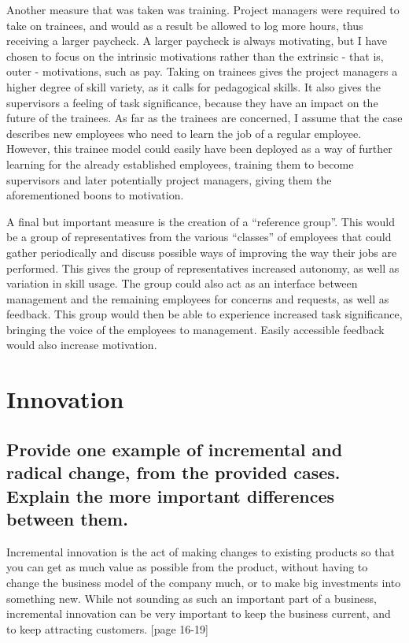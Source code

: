 \documentclass[a4paper]{article}
\begin{document}
    Another measure that was taken was training. Project managers were
    required to take on trainees, and would as a result be allowed to log
    more hours, thus receiving a larger paycheck. A larger paycheck is always
    motivating, but I have chosen to focus on the intrinsic motivations rather
    than the extrinsic - that is, outer - motivations, such as pay. Taking on
    trainees gives the project managers a higher degree of skill variety, as
    it calls for pedagogical skills. It also gives the supervisors a feeling
    of task significance, because they have an impact on the future of the
    trainees. As far as the trainees are concerned, I assume that the case
    describes new employees who need to learn the job of a regular employee.
    However, this trainee model could easily have been deployed as a way of
    further learning for the already established employees, training them to
    become supervisors and later potentially project managers, giving them the
    aforementioned boons to motivation.

    A final but important measure is the creation of a ``reference group''.
    This would be a group of representatives from the various ``classes''
    of employees that could gather periodically and discuss possible ways
    of improving the way their jobs are performed. This gives the group
    of representatives increased autonomy, as well as variation in skill
    usage. The group could also act as an interface between management and
    the remaining employees for concerns and requests, as well as feedback.
    This group would then be able to experience increased task significance,
    bringing the voice of the employees to management. Easily accessible
    feedback would also increase motivation.

    \section{Innovation} %

    \subsection*{Provide one example of incremental and radical change, from
    the provided cases. Explain the more important differences between them.}

    Incremental innovation is the act of making changes to existing products
    so that you can get as much value as possible from the product, without
    having to change the business model of the company much, or to make big
    investments into something new. While not sounding as such an important
    part of a business, incremental innovation can be very important to keep
    the business current, and to keep attracting customers. [page 16-19]
\end{document}
